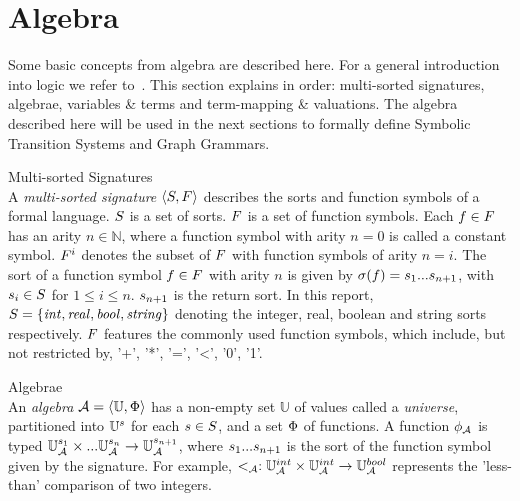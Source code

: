 \section{Algebra}\label{sec:algebra}

Some basic concepts from algebra are described here. For a general introduction into logic we refer to~\cite{Huth:logic}. This section explains in order: multi-sorted signatures, algebrae, variables \& terms and term-mapping \& valuations. The algebra described here will be used in the next sections to formally define Symbolic Transition Systems and Graph Grammars.

\vspace{5px}\begin{definition} Multi-sorted Signatures \\
A \textit{multi-sorted signature} $\langle S, F \rangle$ describes the sorts and function symbols of a formal language. $S$ is a set of sorts. $F$ is a set of function symbols. Each $f \in F$ has an arity $n \in \mathbb{N}$, where a function symbol with arity $n = 0$ is called a constant symbol. $F^i$ denotes the subset of $F$ with function symbols of arity $n = i$. The sort of a function symbol $f \in F$ with arity $n$ is given by $\sigma(f) = s_1 ... s_{n+1}$, with $s_i \in S$ for $1 \leq i \leq n$. $s_{n+1}$ is the return sort. In this report, $S =  \{\mathit{int, real, bool, string}\}$ denoting the integer, real, boolean and string sorts respectively. $F$ features the commonly used function symbols, which include, but not restricted by, '+', '*', '=', '<', '0', '1'.
\end{definition}

\vspace{5px}\begin{definition} Algebrae \\
An \textit{algebra} $\mathcal{A} = \langle \mathbb{U}, \Phi\rangle$ has a non-empty set $\mathbb{U}$ of values called a \textit{universe}, partitioned into $\mathbb{U}^s$ for each $s \in S$, and a set $\Phi$ of functions. A function $\phi_{\mathcal{A}}$ is typed $\mathbb{U}_{\mathcal{A}}^{s_1} \times ... \mathbb{U}_{\mathcal{A}}^{s_n} \rightarrow \mathbb{U}_{\mathcal{A}}^{s_{n+1}}$, where $s_1 ... s_{n+1}$ is the sort of the function symbol given by the signature. For example, $<_{\mathcal{A}}: \mathbb{U}_{\mathcal{A}}^{int} \times \mathbb{U}_{\mathcal{A}}^{int} \rightarrow \mathbb{U}_{\mathcal{A}}^{bool}$ represents the 'less-than' comparison of two integers.
\end{definition}

